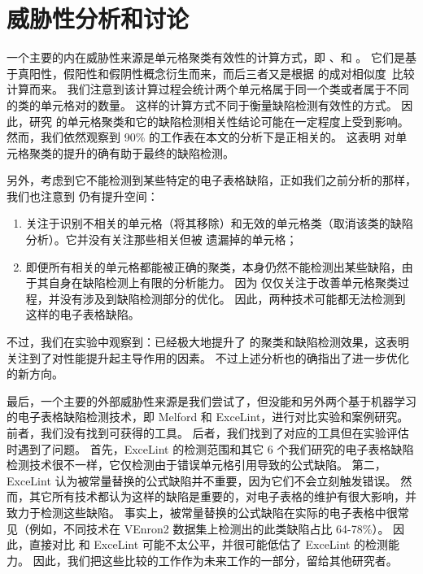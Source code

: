 \section{威胁性分析和讨论}

一个主要的内在威胁性来源是单元格聚类有效性的计算方式，即 \prc 、\rec 和 \fmc 。
它们是基于真阳性，假阳性和假阴性概念衍生而来，而后三者又是根据 \cu 的成对相似度~\cite{cheung2016custodes}比较计算而来。
我们注意到该计算过程会统计两个单元格属于同一个类或者属于不同的类的单元格对的数量。
这样的计算方式不同于衡量缺陷检测有效性的方式。
因此，研究 \wa 的单元格聚类和它的缺陷检测相关性结论可能在一定程度上受到影响。
然而，我们依然观察到 90\% 的工作表在本文的分析下是正相关的。
这表明 \wa 对单元格聚类的提升的确有助于最终的缺陷检测。

另外，考虑到它不能检测到某些特定的电子表格缺陷，正如我们之前分析的那样，我们也注意到 \wa 仍有提升空间：
\begin{enumerate}
    \item \wa 关注于识别不相关的单元格（将其移除）和无效的单元格类（取消该类的缺陷分析）。它并没有关注那些相关但被 \cu 遗漏掉的单元格；
    \item 即便所有相关的单元格都能被正确的聚类，\cu 本身仍然不能检测出某些缺陷，由于其自身在缺陷检测上有限的分析能力。
    因为 \wa 仅仅关注于改善单元格聚类过程，并没有涉及到缺陷检测部分的优化。
    因此，两种技术可能都无法检测到这样的电子表格缺陷。
\end{enumerate}

不过，我们在实验中观察到：\wa 已经极大地提升了 \cu 的聚类和缺陷检测效果，这表明 \wa 关注到了对性能提升起主导作用的因素。
不过上述分析也的确指出了进一步优化的新方向。

最后，一个主要的外部威胁性来源是我们尝试了，但没能和另外两个基于机器学习的电子表格缺陷检测技术，即 Melford\cite{singh2017melford} 和 ExceLint\cite{Barowy2018excelint}，进行对比实验和案例研究。
前者，我们没有找到可获得的工具。
后者，我们找到了对应的工具但在实验评估时遇到了问题。
首先，ExceLint 的检测范围和其它 6 个我们研究的电子表格缺陷检测技术很不一样，它仅检测由于错误单元格引用导致的公式缺陷。
第二，ExceLint 认为被常量替换的公式缺陷并不重要，因为它们不会立刻触发错误。
然而，其它所有技术都认为这样的缺陷是重要的，对电子表格的维护有很大影响，并致力于检测这些缺陷。
事实上，被常量替换的公式缺陷在实际的电子表格中很常见（例如，不同技术在 VEnron2 数据集上检测出的此类缺陷占比 64-78\%）。
因此，直接对比 \wa 和 ExceLint 可能不太公平，并很可能低估了 ExceLint 的检测能力。
因此，我们把这些比较的工作作为未来工作的一部分，留给其他研究者。